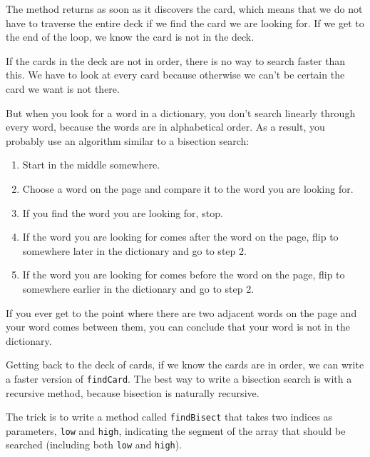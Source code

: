 \documentclass[12pt]{book}
\theoremstyle{definition}
\begin{document}

The method returns as soon as it discovers
the card, which means that we do not have to traverse the entire
deck if we find the card we are looking for.  If we get to the end
of the loop, we know the card is not in the deck.

If the cards in the deck are not in order, there is no way to search
faster than this.  We have to look at every card because
otherwise we can't be certain the card we want is not
there.


But when you look for a word in a dictionary, you don't search
linearly through every word, because the words are in
alphabetical order.  As a result, you probably use an algorithm
similar to a bisection search:

\begin {enumerate}

\item Start in the middle somewhere.

\item Choose a word on the page and compare it to the word you
are looking for.

\item If you find the word you are looking for, stop.

\item If the word you are looking for comes after the word on
the page, flip to somewhere later in the dictionary and go to
step 2.

\item If the word you are looking for comes before the word on
the page, flip to somewhere earlier in the dictionary and go to
step 2.

\end {enumerate}

If you ever get to the point where there are two adjacent words on the
page and your word comes between them, you can conclude that your word
is not in the dictionary.

Getting back to the deck of cards, if we know the cards are in order,
we can write a faster version of {\tt findCard}.  The best way to
write a bisection search is with a recursive method, because bisection
is naturally recursive.  

The trick is to write a method called {\tt findBisect} that takes
two indices as parameters, {\tt low} and {\tt high}, indicating the
segment of the array that should be searched (including both
{\tt low} and {\tt high}).
\end{document}
